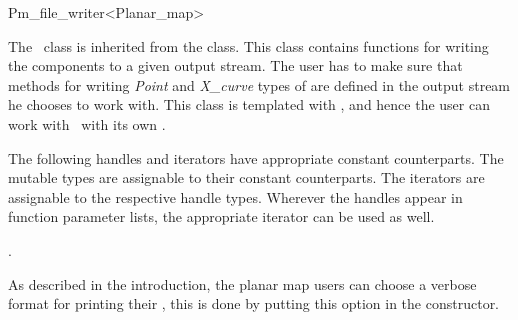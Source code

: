 
\ccRefPageBegin


\begin{ccRefClass}{Pm_file_writer<Planar_map>}


\ccDefinition
The \ccRefName\ class is inherited from the  class. 
This class contains functions for writing the  components to a given output stream.
The user has to make sure that methods for writing {\em Point} and {\em X\_curve} types of  are defined in the output stream he chooses to work with.
This class is templated with , and hence the user can work with \ccRefName\ with its own . 
 

\ccTypes

The following handles and iterators have appropriate constant counterparts. The mutable types are assignable to their
constant counterparts. The iterators are assignable to the respective handle types. 
Wherever the handles appear in function parameter lists, the appropriate iterator can be used as well. 

.

\ccCreation
As described in the introduction, the planar map users can choose a verbose format for printing their , this is done by putting this option in the constructor.


\end{ccRefClass}
